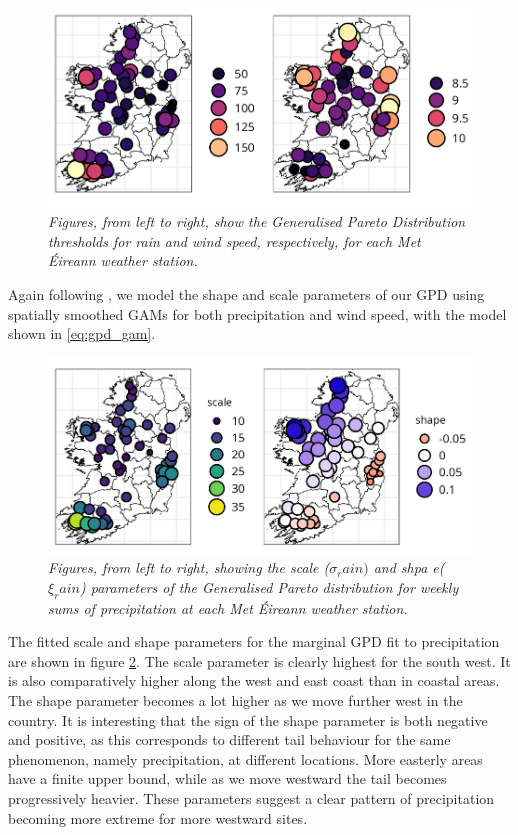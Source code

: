 \documentclass{article}
\numberwithin{equation}{section}
\begin{document}
\begin{figure}[H]
    \centering
    \includegraphics[width = 0.9\linewidth]{plots/031_thresh_plots_crop.png}
    \caption{\emph{Figures, from left to right, show the Generalised Pareto Distribution thresholds for rain and wind speed, respectively, for each Met Éireann weather station.}}
    \label{fig:03_uni_thresh}
\end{figure}


Again following \citet{Youngman2019}, we model the shape and scale parameters of our GPD using spatially smoothed GAMs for both precipitation and wind speed, with the model shown in \eqref{eq:gpd_gam}.

\begin{figure}[H]
    \centering
    \includegraphics[width = 0.9\linewidth]{plots/032_gpd_rain_crop.png}
    \caption{\emph{Figures, from left to right, showing the scale ($\sigma_rain)$ and shpa e($\xi_rain$) parameters of the Generalised Pareto distribution for weekly sums of precipitation at each Met Éireann weather station.}}
    \label{fig:03_gpd_rain}
\end{figure}

The fitted scale and shape parameters for the marginal GPD fit to precipitation are shown in figure \ref{fig:03_gpd_rain}.
The scale parameter is clearly highest for the south west. 
It is also comparatively higher along the west and east coast than in coastal areas.
The shape parameter becomes a lot higher as we move further west in the country. 
It is interesting that the sign of the shape parameter is both negative and positive, as this corresponds to different tail behaviour for the same phenomenon, namely precipitation, at different locations.
More easterly areas have a finite upper bound, while as we move westward the tail becomes progressively heavier.
These parameters suggest a clear pattern of precipitation becoming more extreme for more westward sites.
\end{document}
